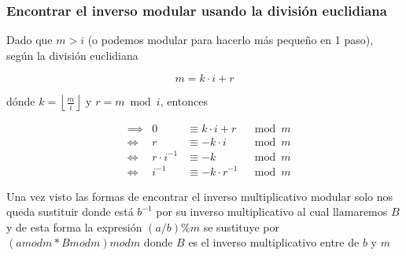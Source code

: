\subsubsection{Encontrar el inverso modular usando la división euclidiana}

Dado que $m>i$ (o podemos modular para hacerlo más pequeño en 1 paso), según la división euclidiana

$$m = k \cdot i + r$$

dónde $k= \left\lfloor \frac{m}{i} \right\rfloor$ y $r=m \bmod i$, entonces


\begin{align*}
	& \implies & 0          & \equiv k \cdot i + r   & \mod m \\
	& \iff & r              & \equiv -k \cdot i      & \mod m \\
	& \iff & r \cdot i^{-1} & \equiv -k              & \mod m \\
	& \iff & i^{-1}         & \equiv -k \cdot r^{-1} & \mod m
\end{align*}


Una vez visto las formas de encontrar el inverso multiplicativo modular solo nos queda sustituir donde está $b^{-1}$ por su inverso multiplicativo al cual llamaremos $B$ y de esta forma la expresión $(a/b) \% m$ se sustituye por $(a mod m * B mod m) mod m$ donde $B$ es el inverso multiplicativo entre de $b$ y $m$ 

